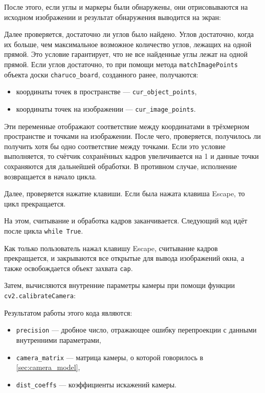 \documentclass[14pt, a4paper]{extarticle}
\begin{document}
После этого, если углы и маркеры были обнаружены, они отрисовываются на
исходном изображении и результат обнаружения выводится на экран:

Далее проверяется, достаточно ли углов было найдено. 
Углов достаточно, когда их больше, чем максимальное возможное количество углов,
лежащих на одной прямой. Это условие гарантирует, что не все найденные углы
лежат на одной прямой. Если углов достаточно, то при помощи метода
\texttt{matchImagePoints} объекта доски \texttt{charuco\_board}, созданного
ранее, получаются:
\begin{itemize}
  \item координаты точек в пространстве --- \texttt{cur\_object\_points}, 
  \item координаты точек на изображении --- \texttt{cur\_image\_points}.
\end{itemize}
Эти переменные отображают соответствие между координатами в трёхмерном
пространстве и точками на изображении.
После чего, проверяется, получилось ли получить хотя бы одно соответствие между
точками. Если это условие выполняется, то счётчик сохранённых кадров
увеличивается на 1 и данные точки сохраняются для дальнейшей обработки. В
противном случае, исполнение возвращается в начало цикла.

Далее, проверяется нажатие клавиши. Если была нажата клавиша Escape, то цикл прекращается.

На этом, считывание и обработка кадров заканчивается. Следующий код идёт после цикла \texttt{while True}.

Как только пользователь нажал клавишу Escape, считывание кадров прекращается,
и закрываются все открытые для вывода изображений окна, а также освобождается
объект захвата \texttt{cap}.

Затем, вычисляются внутренние параметры камеры при помощи функции\\
\texttt{cv2.calibrateCamera}:


Результатом работы этого кода являются:
\begin{itemize}
  \item \texttt{precision} --- дробное число, отражающее ошибку перепроекции с данными внутренними параметрами,
  \item \texttt{camera\_matrix} --- матрица камеры, о которой говорилось в \ref{sec:camera_model},
  \item \texttt{dist\_coeffs} --- коэффициенты искажений камеры.
\end{itemize}
\end{document}
